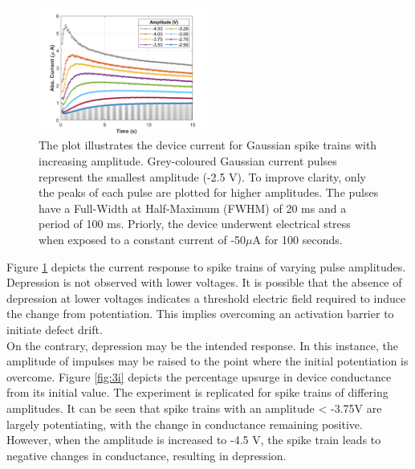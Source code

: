 \begin{figure}[htbp!] 
\centering    
\includegraphics[width=0.5\textwidth]{Chapter3/Figs/3h.png}
\caption[Dependence of potentiation and depression on the amplitude of applied voltage pulses.]{The plot illustrates the device current for Gaussian spike trains with increasing amplitude. Grey-coloured Gaussian current pulses represent the smallest amplitude (-2.5 V). To improve clarity, only the peaks of each pulse are plotted for higher amplitudes. The pulses have a Full-Width at Half-Maximum (FWHM) of 20 ms and a period of 100 ms. Priorly, the device underwent electrical stress when exposed to a constant current of -50$\mu$A for 100 seconds.}
\label{fig:3h}
\end{figure}

\noindent Figure \ref{fig:3h} depicts the current response to spike trains of varying pulse amplitudes. Depression is not observed with lower voltages. It is possible that the absence of depression at lower voltages indicates a threshold electric field required to induce the change from potentiation. This implies overcoming an activation barrier to initiate defect drift.\\

\noindent On the contrary, depression may be the intended response. In this instance, the amplitude of impulses may be raised to the point where the initial potentiation is overcome. Figure \ref{fig:3i} depicts the percentage upsurge in device conductance from its initial value. The experiment is replicated for spike trains of differing amplitudes. It can be seen that spike trains with an amplitude < -3.75V are largely potentiating, with the change in conductance remaining positive. However, when the amplitude is increased to -4.5 V, the spike train leads to negative changes in conductance, resulting in depression.\\

